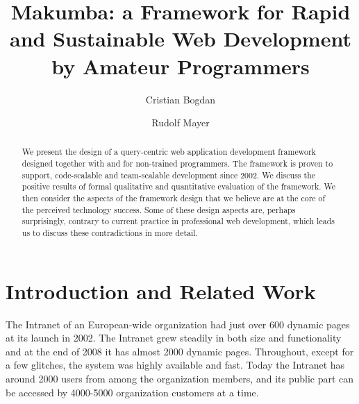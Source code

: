 \documentclass{llncs}
\begin{document}
\title{Makumba: a Framework for Rapid and Sustainable Web Development by Amateur Programmers}


\author{Cristian Bogdan  \and Rudolf Mayer}



\maketitle
\begin{abstract}
We present the design of a query-centric web application development framework designed together with and for non-trained programmers. The framework is proven to support, code-scalable and team-scalable development since 2002. We discuss the positive results of formal qualitative and quantitative evaluation of the framework. We then consider the aspects of the framework design that we believe are at the core of the perceived technology success. Some of these design aspects are, perhaps surprisingly, contrary to current practice in professional web development, which leads us to discuss these contradictions in more detail.
\end{abstract}

\section{Introduction and Related Work}\label{sec:introduction}
The Intranet of an European-wide organization had just over 600 dynamic pages at its launch in 2002. The Intranet grew steadily in both size and functionality and at the end of 2008 it has almost 2000 dynamic pages. Throughout, except for a few glitches, the system was highly available and fast. Today the Intranet has around 2000 users from among the organization members, and its public part can be accessed by 4000-5000 organization customers at a time.
\end{document}
